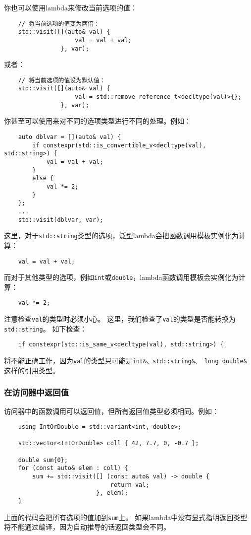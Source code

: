 你也可以使用lambda来修改当前选项的值：
\begin{lstlisting}
    // 将当前选项的值变为两倍：
    std::visit([](auto& val) {
                    val = val + val;
                }, var);
\end{lstlisting}
或者：
\begin{lstlisting}
    // 将当前选项的值设为默认值：
    std::visit([](auto& val) {
                    val = std::remove_reference_t<decltype(val)>{};
                }, var);
\end{lstlisting}
你甚至可以使用来对不同的选项类型进行不同的处理。例如：
\begin{lstlisting}
    auto dblvar = [](auto& val) {
        if constexpr(std::is_convertible_v<decltype(val), std::string>) {
            val = val + val;
        }
        else {
            val *= 2;
        }
    };
    ...
    std::visit(dblvar, var);
\end{lstlisting}
这里，对于\texttt{std::string}类型的选项，泛型lambda会把函数调用模板实例化为计算：
\begin{lstlisting}
    val = val + val;
\end{lstlisting}
而对于其他类型的选项，例如\texttt{int}或\texttt{double}，lambda函数调用模板会实例化为计算：
\begin{lstlisting}
    val *= 2;
\end{lstlisting}
注意检查\texttt{val}的类型时必须小心。
这里，我们检查了\texttt{val}的类型是否能转换为\texttt{std::string}。
如下检查：
\begin{lstlisting}
    if constexpr(std::is_same_v<decltype(val), std::string>) {
\end{lstlisting}
将不能正确工作，因为\texttt{val}的类型只可能是\texttt{int\&、std::string\&、
long double\&}这样的引用类型。

\subsubsection{在访问器中返回值}
访问器中的函数调用可以返回值，但所有返回值类型必须相同。例如：
\begin{lstlisting}
    using IntOrDouble = std::variant<int, double>;

    std::vector<IntOrDouble> coll { 42, 7.7, 0, -0.7 };

    double sum{0};
    for (const auto& elem : coll) {
        sum += std::visit([] (const auto& val) -> double {
                              return val;
                          }, elem);
    }
\end{lstlisting}
上面的代码会把所有选项的值加到\texttt{sum}上。
如果lambda中没有显式指明返回类型将不能通过编译，因为自动推导的话返回类型会不同。

